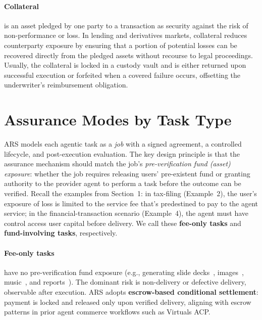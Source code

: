 \documentclass{article} %
\begin{document}
\paragraph{Collateral} is an asset pledged by one party to a transaction as security against the risk of non-performance or loss. In lending and derivatives markets, collateral reduces counterparty exposure by ensuring that a portion of potential losses can be recovered directly from the pledged assets without recourse to legal proceedings. Usually, the collateral is locked in a custody vault and is either returned upon successful execution or forfeited when a covered failure occurs, offsetting the underwriter's reimbursement obligation. 


\section{Assurance Modes by Task Type}
\textsc{ARS} models each agentic task as a \emph{job} with a signed agreement, a controlled lifecycle, and post-execution evaluation. The key design principle is that the assurance mechanism should match the job's \emph{pre-verification fund (asset) exposure}: whether the job requires releasing users' pre-existent fund or granting authority to the provider agent to perform a task before the outcome can be verified. Recall the examples from Section~1: in tax-filing (Example~2), the user's exposure of loss is limited to the service fee that's predestined to pay to the agent service; in the financial-transaction scenario (Example~4), the agent must have control access user capital before delivery. We call these \textbf{fee-only tasks} and \textbf{fund-involving tasks}, respectively.

\paragraph{Fee-only tasks} have no pre-verification fund exposure (e.g., generating slide decks~\citep{liang2025slidegen, liangpaper2slide}, images~\citep{zhang2025postergen, shin2025postermate}, music~\citep{yu2023musicagent, deng2024composerx}, and reports~\citep{tian2025template}). The dominant risk is non-delivery or defective delivery, observable after execution. \textsc{ARS} adopts \textbf{escrow-based conditional settlement}: payment is locked and released only upon verified delivery, aligning with escrow patterns in prior agent commerce workflows such as Virtuals ACP.
\end{document}
